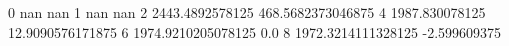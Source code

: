 0 nan nan
1 nan nan
2 2443.4892578125 468.5682373046875
4 1987.830078125 12.9090576171875
6 1974.9210205078125 0.0
8 1972.3214111328125 -2.599609375
